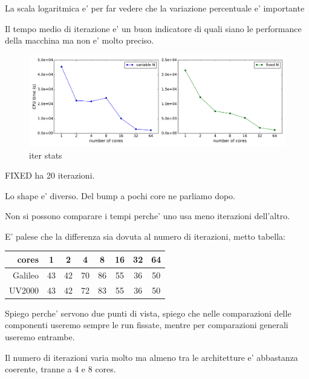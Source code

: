 \documentclass[a4paper,12pt]{article}
\begin{document}
La scala logaritmica e' per far vedere che la variazione percentuale e' importante

Il tempo medio di iterazione e' un buon indicatore di quali siano le performance della macchina ma non e' molto preciso.


\newpage

\begin{figure}[hhh!]
	\centerline{\includegraphics[width=1.2\linewidth]{fixed_vs_variable.pdf}}
	\caption{ iter stats
	}
	\label{fig:fixedvsvariable}
\end{figure}

FIXED ha 20 iterazioni.

Lo shape e' diverso. Del bump a pochi core ne parliamo dopo.

Non si possono comparare i tempi perche' uno usa meno iterazioni dell'altro.

E' palese che la differenza sia dovuta al numero di iterazioni, metto tabella:





\begin{center}
\begin{tabular}{r|ccccccc}
\toprule
cores 	 &  1  &  2  &  4  &  8  &  16  &  32  &  64 \\
\midrule
Galileo	 & 43  & 42  & 70  & 86  &  55  &  36  &  50 \\ 
UV2000	 & 43  & 42  & 72  & 83  &  55  &  36  &  50 \\ 
\bottomrule
\end{tabular}
\end{center}

Spiego perche' servono due punti di vista, spiego che nelle comparazioni delle componenti useremo sempre le run fissate, mentre per comparazioni generali useremo entrambe.

Il numero di iterazioni varia molto ma almeno tra le architetture e' abbastanza coerente, tranne a 4 e 8 cores.
\end{document}
